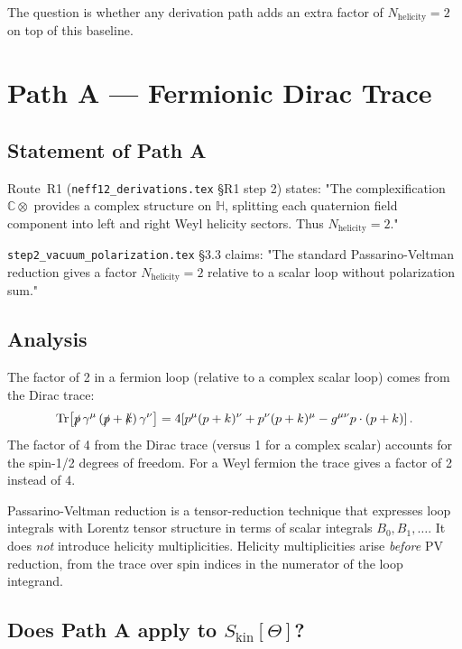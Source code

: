 \documentclass[12pt,a4paper]{article}
\theoremstyle{remark}
\newcommand{\Nhelicity}{N_{\mathrm{helicity}}}
\begin{document}
The question is whether any derivation path adds an extra factor of $\Nhelicity = 2$
on top of this baseline.

\section{Path A — Fermionic Dirac Trace}
\label{sec:pathA}

\subsection{Statement of Path A}

Route~R1 (\texttt{neff12\_derivations.tex} §R1 step 2) states: "The
complexification $\mathbb{C}\otimes$ provides a complex structure on $\mathbb{H}$,
splitting each quaternion field component into left and right Weyl helicity
sectors.  Thus $\Nhelicity = 2$."

\texttt{step2\_vacuum\_polarization.tex} §3.3 claims: "The standard
Passarino-Veltman reduction gives a factor $\Nhelicity = 2$ relative to a
scalar loop without polarization sum."

\subsection{Analysis}

The factor of 2 in a fermion loop (relative to a complex scalar loop)
comes from the Dirac trace:
\begin{equation}
  \mathrm{Tr}\!\left[\slashed{p}\,\gamma^\mu\,(\slashed{p}+\slashed{k})\,\gamma^\nu\right]
  = 4\!\left[p^\mu(p+k)^\nu + p^\nu(p+k)^\mu - g^{\mu\nu}p\cdot(p+k)\right].
  \label{eq:Dirac_trace}
\end{equation}
The factor of 4 from the Dirac trace (versus 1 for a complex scalar) accounts
for the spin-1/2 degrees of freedom.  For a Weyl fermion the trace gives a
factor of 2 instead of 4.

Passarino-Veltman reduction is a tensor-reduction technique that expresses
loop integrals with Lorentz tensor structure in terms of scalar integrals
$B_0, B_1, \ldots$.  It does \emph{not} introduce helicity multiplicities.
Helicity multiplicities arise \emph{before} PV reduction, from the trace over
spin indices in the numerator of the loop integrand.

\subsection{Does Path A apply to $S_{\mathrm{kin}}[\Theta]$?}
\end{document}
